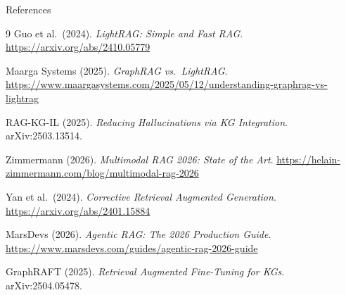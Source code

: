 \documentclass[aspectratio=169,11pt]{beamer}
\begin{document}
\begin{frame}[allowframebreaks]{References}
  \begin{thebibliography}{9}\footnotesize
      Guo et al.\ (2024). \textit{LightRAG: Simple and Fast RAG}.
      \url{https://arxiv.org/abs/2410.05779}

      Maarga Systems (2025). \textit{GraphRAG vs.\ LightRAG}.
      \url{https://www.maargasystems.com/2025/05/12/understanding-graphrag-vs-lightrag}

      RAG-KG-IL (2025). \textit{Reducing Hallucinations via KG Integration}.
      arXiv:2503.13514.

      Zimmermann (2026). \textit{Multimodal RAG 2026: State of the Art}.
      \url{https://helain-zimmermann.com/blog/multimodal-rag-2026}

      Yan et al.\ (2024). \textit{Corrective Retrieval Augmented Generation}.
      \url{https://arxiv.org/abs/2401.15884}

      MarsDevs (2026). \textit{Agentic RAG: The 2026 Production Guide}.
      \url{https://www.marsdevs.com/guides/agentic-rag-2026-guide}

      GraphRAFT (2025). \textit{Retrieval Augmented Fine-Tuning for KGs}.
      arXiv:2504.05478.
  \end{thebibliography}
\end{frame}
\end{document}
